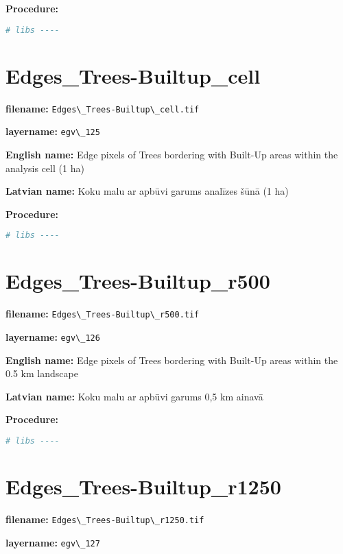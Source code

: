 \documentclass[
]{book}
\newcommand{\passthrough}[1]{#1}
\begin{document}
\textbf{Procedure:}

\begin{lstlisting}[language=R]
# libs ----
\end{lstlisting}

\section{Edges\_Trees-Builtup\_cell}\label{ch06.125}

\textbf{filename:} \passthrough{\lstinline!Edges\_Trees-Builtup\_cell.tif!}

\textbf{layername:} \passthrough{\lstinline!egv\_125!}

\textbf{English name:} Edge pixels of Trees bordering with Built-Up areas within the analysis cell (1 ha)

\textbf{Latvian name:} Koku malu ar apbūvi garums analīzes šūnā (1 ha)

\textbf{Procedure:}

\begin{lstlisting}[language=R]
# libs ----
\end{lstlisting}

\section{Edges\_Trees-Builtup\_r500}\label{ch06.126}

\textbf{filename:} \passthrough{\lstinline!Edges\_Trees-Builtup\_r500.tif!}

\textbf{layername:} \passthrough{\lstinline!egv\_126!}

\textbf{English name:} Edge pixels of Trees bordering with Built-Up areas within the 0.5 km landscape

\textbf{Latvian name:} Koku malu ar apbūvi garums 0,5 km ainavā

\textbf{Procedure:}

\begin{lstlisting}[language=R]
# libs ----
\end{lstlisting}

\section{Edges\_Trees-Builtup\_r1250}\label{ch06.127}

\textbf{filename:} \passthrough{\lstinline!Edges\_Trees-Builtup\_r1250.tif!}

\textbf{layername:} \passthrough{\lstinline!egv\_127!}
\end{document}
